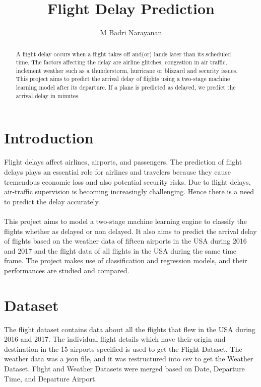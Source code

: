 \documentclass[12pt,letterpaper]{article}
\begin{document}
\title{Flight Delay Prediction}
\author{M Badri Narayanan }
\date{}
\maketitle

\begin{abstract}
    
    A flight delay occurs when a flight takes off and(or) lands later than its scheduled time. The factors affecting the delay are airline glitches, congestion in air traffic, inclement weather such as a thunderstorm, hurricane or blizzard and security issues. This project aims to predict the arrival delay of flights using a two-stage machine learning model after its departure. If a plane is predicted as delayed, we predict the arrival delay in minutes.
   
\end{abstract}


\section{Introduction}

    Flight delays affect airlines, airports, and passengers. The prediction of flight delays plays an essential role for airlines and travelers because they cause tremendous economic loss and also potential security risks. Due to flight delays, air-traffic supervision is becoming increasingly challenging. Hence there is a need to predict the delay accurately. 

    \paragraph{}
    
    This project aims to model a two-stage machine learning engine to classify the flights whether as delayed or non delayed. It also aims to predict the arrival delay of flights based on the weather data of fifteen airports in the USA during 2016 and 2017 and the flight data of all flights in the USA during the same time frame. The project makes use of classification and regression models, and their performances are studied and compared.

     
     
\section{Dataset}
   
     The flight dataset contains data about all the flights that flew in the USA during 2016 and 2017. The individual flight details which have their origin and destination in the 15 airports specified is used to get the Flight Dataset. The weather data was a json file, and it was restructured into csv to get the Weather Dataset. Flight and Weather Datasets were merged based on Date, Departure Time, and Departure Airport.
    
\end{document}
